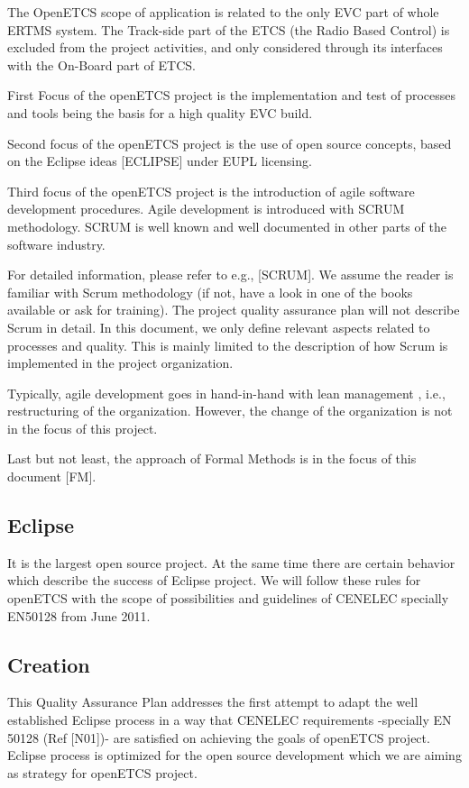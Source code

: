 \documentclass{template/openetcs_article}
\begin{document}
The OpenETCS scope of application is related to the only EVC part of whole ERTMS system. The Track-side part of the ETCS (the Radio Based Control) is excluded from the project activities, and only considered through its interfaces with the On-Board part of ETCS.

First Focus of the openETCS project is the implementation and test of processes and tools being the basis for a high quality EVC build.

Second focus of the openETCS project is the use of open source concepts, based on the Eclipse ideas [ECLIPSE] under EUPL licensing.

Third focus of the openETCS project is the introduction of agile software development procedures. Agile development is introduced with SCRUM methodology. SCRUM is well known and well documented in other parts of the software industry. 

For detailed information, please refer to e.g., [SCRUM]. We assume the reader is familiar with Scrum methodology (if not, have a look in one of the books available or ask for training). The project quality assurance plan will not describe Scrum in detail. In this document, we only define relevant aspects related to processes and quality. This is mainly limited to the description of how Scrum is implemented in the project organization.

Typically, agile development goes in hand-in-hand with lean management , i.e., restructuring of the organization. However, the change of the organization is not in the focus of this project. 

Last but not least, the approach of Formal Methods is in the focus of this document [FM].



\subsection{Eclipse}
It is the largest open source project. At the same time there are certain behavior which describe the success of Eclipse project. We will follow these rules for openETCS with the scope of possibilities and guidelines of CENELEC specially EN50128 from June 2011.


\subsection{Creation}
This Quality Assurance Plan addresses the first attempt to adapt the well established Eclipse process in a way that CENELEC requirements -specially EN 50128 (Ref [N01])- are satisfied on achieving the goals of openETCS project. Eclipse process is optimized for the open source development which we are aiming as strategy for openETCS project.
\end{document}
